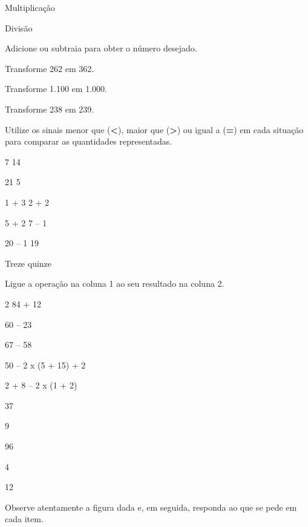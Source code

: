 {}

\startitemize
\item
  {\sc Multiplicação}
\stopitemize

{}

\startitemize
\item
  {\sc Divisão}
\stopitemize

{}

\subsubject[title={Atividades},reference={atividades}]

\subsubsubsection[reference={section}]

Adicione ou subtraia para obter o número desejado.

\startitemize
\item
  Transforme 262 em 362.\crlf
\item
  Transforme 1.100 em 1.000.\crlf
\item
  Transforme 238 em 239.\crlf
\stopitemize

\subsubsubsection[reference={section-1}]

Utilize os sinais menor que ({\bf <}), maior que ({\bf >}) ou igual a
({\bf =}) em cada situação para comparar as quantidades representadas.

\startitemize
\item
  7 14
\item
  21 5
\item
  1 + 3 2 + 2
\stopitemize

\startitemize
\item
  5 + 2 7 -- 1
\item
  20 -- 1 19
\item
  Treze quinze
\stopitemize

\subsubsubsection[reference={section-2}]

Ligue a operação na coluna 1 ao seu resultado na coluna 2.

2 84 + 12

60 -- 23

67 -- 58

50 -- 2 x (5 + 15) + 2

2 + 8 -- 2 x (1 + 2)

37

9

96

4

12

\subsubsubsection[reference={section-3}]

Observe atentamente a figura dada e, em seguida, responda ao que se pede
em cada item.

